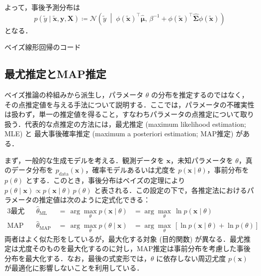 \documentclass[titlepage]{ltjsbook}
\begin{document}
よって，事後予測分布は
\begin{equation}
p(\tilde{y} \mid \tilde{\mathbf{x}},\mathbf{y},\mathbf{X})\coloneq\mathcal{N}\left(\tilde{y}\;\middle\vert\; \phi(\tilde{\mathbf{x}})^\top\hat{\boldsymbol{\mu}},\,\beta^{-1}+\phi(\tilde{\mathbf{x}})^\top\hat{\boldsymbol{\Sigma}} \phi(\tilde{\mathbf{x}})\right)
\end{equation}
となる．

\begin{tcolorbox}
ベイズ線形回帰のコード
\end{tcolorbox}

\subsection{最尤推定とMAP推定}
ベイズ推論の枠組みから派生し，パラメータ $\theta$ の分布を推定するのではなく，その点推定値を与える手法について説明する．ここでは，パラメータの不確実性は扱わず，単一の推定値を得ること，すなわちパラメータの点推定について取り扱う．代表的な点推定の方法には，最尤推定 (maximum likelihood estimation; MLE) と 最大事後確率推定 (maximum a posteriori estimation; MAP推定) がある．

まず，一般的な生成モデルを考える．観測データを $\mathbf{x}$，未知パラメータを $\theta$，真のデータ分布を $p_{\mathrm{data}}(\mathbf{x})$，確率モデルあるいは尤度を $p(\mathbf{x}\mid \theta)$，事前分布を $p(\theta)$ とする．このとき，事後分布はベイズの定理により $p(\theta \mid \mathbf{x}) \propto p(\mathbf{x}\mid \theta)\,p(\theta)$ と表される．この設定の下で，各推定法におけるパラメータの推定値は次のように定式化できる：
\begin{alignat}{3}
\text{最尤推定:} &\quad \hat{\theta}_{\mathrm{ML}}\,&=\, \arg\max_{\theta} p(\mathbf{x} \mid \theta) &= \arg\max_{\theta}\, \ln p(\mathbf{x} \mid \theta)\\
\text{MAP推定:} &\quad \hat{\theta}_{\mathrm{MAP}}\,&=\, \arg\max_{\theta} p(\theta \mid \mathbf{x}) &= \arg\max_{\theta}\,\left[\ln p(\mathbf{x} \mid \theta) + \ln p(\theta)\right]
\end{alignat}
両者はよく似た形をしているが，最大化する対象 (目的関数) が異なる．最尤推定は尤度そのものを最大化するのに対し，MAP推定は事前分布を考慮した事後分布を最大化する．なお，最後の式変形では，$\theta$ に依存しない周辺尤度 $p(\mathbf{x})$ が最適化に影響しないことを利用している．
\end{document}
